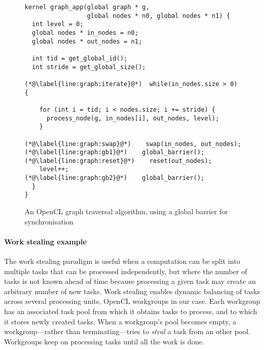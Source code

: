 \documentclass[numbers,nocopyrightspace,10pt]{sigplanconf}
\begin{document}
\begin{figure}

\begin{lstlisting}
kernel graph_app(global graph * g, 
                 global nodes * n0, global nodes * n1) {
  int level = 0;
  global nodes * in_nodes = n0;
  global nodes * out_nodes = n1;

  int tid = get_global_id();
  int stride = get_global_size();

(*@\label{line:graph:iterate}@*)  while(in_nodes.size > 0) {

    for (int i = tid; i < nodes.size; i += stride) {
      process_node(g, in_nodes[i], out_nodes, level);
    }

(*@\label{line:graph:swap}@*)    swap(in_nodes, out_nodes);
(*@\label{line:graph:gb1}@*)    global_barrier();
(*@\label{line:graph:reset}@*)    reset(out_nodes);
    level++;
(*@\label{line:graph:gb2}@*)    global_barrier();
  }
}
\end{lstlisting}
\caption{An OpenCL graph traversal algorithm, using a global barrier for synchronisation}\label{fig:graphsearch}
\end{figure}

\paragraph{Work stealing example}
%
The work stealing paradigm is useful when a computation can be split into multiple
tasks that can be processed independently, but where the number of
tasks is not known ahead of time because processing a given task may
create an arbitrary number of new tasks. Work stealing enables dynamic
balancing of tasks across several processing units, OpenCL workgroups
in our case. Each workgroup has an associated task pool from which it
obtains tasks to process, and to which it stores newly created
tasks. When a workgroup's pool becomes empty, a workgroup---rather
than terminating---tries to \emph{steal} a task from an other
pool. Workgroups keep on processing tasks until all the work is
done.
\end{document}
